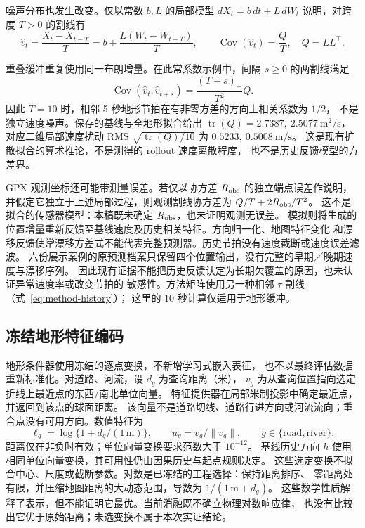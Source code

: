 \documentclass[UTF8,11pt]{ctexart}
\begin{document}
\begin{samepage}
噪声分布也发生改变。仅以常数 \(b,L\) 的局部模型
\(dX_t=b\,dt+L\,dW_t\) 说明，对跨度 \(T>0\) 的割线有
\begin{equation}
\widehat v_t=\frac{X_t-X_{t-T}}{T}
=b+\frac{L(W_t-W_{t-T})}{T},\qquad
\operatorname{Cov}(\widehat v_t)=\frac{Q}{T},\quad Q=LL^\top .
\label{eq:secant-local-noise}
\end{equation}
\end{samepage}
重叠缓冲重复使用同一布朗增量。在此常系数示例中，间隔 \(s\ge0\) 的两割线满足
\begin{equation}
\operatorname{Cov}(\widehat v_t,\widehat v_{t+s})
=\frac{(T-s)_+}{T^2}Q .
\label{eq:secant-overlap}
\end{equation}
因此 \(T=10\) 时，相邻 5 秒地形节拍在有非零方差的方向上相关系数为 \(1/2\)，
不是独立速度噪声。保存的基线与全地形拟合给出
\(\operatorname{tr}(Q)=2.7387,\ 2.5077\ \mathrm{m^2/s}\)，
对应二维局部速度扰动 RMS \(\sqrt{\operatorname{tr}(Q)/10}\)
为 \(0.5233,\ 0.5008\ \mathrm{m/s}\)。
这是现有扩散拟合的算术推论，不是测得的 rollout 速度离散程度，
也不是历史反馈模型的方差界。

GPX 观测坐标还可能带测量误差。若仅以协方差 \(R_{\rm obs}\) 的独立端点误差作说明，
并假定它独立于上述局部过程，则观测割线协方差为 \(Q/T+2R_{\rm obs}/T^2\)。
这不是拟合的传感器模型：本稿既未确定 \(R_{\rm obs}\)，也未证明观测无误差。
模拟则将生成的位置增量重新反馈至基线速度及历史相关特征。方向归一化、地图特征变化
和漂移反馈使常漂移方差式不能代表完整预测器。历史节拍没有速度截断或速度误差滤波。
六份展示案例的原预测档案只保留四个位置输出，没有完整的早期／晚期速度与漂移序列。
因此现有证据不能把历史反馈认定为长期欠覆盖的原因，也未认证异常速度率或改变节拍的
敏感性。方法矩阵使用另一种相邻 \(\tau\) 割线（式~\eqref{eq:method-history}）；
这里的 10 秒计算仅适用于地形缓冲。

\subsection{冻结地形特征编码}
\label{sec:feature-encoding}
地形条件器使用冻结的逐点变换，不新增学习式嵌入表征，
也不以最终评估数据重新标准化。对道路、河流，设 \(d_g\) 为查询距离（米），
\(v_g\) 为从查询位置指向选定折线上最近点的东西/南北单位向量。
特征提供器在局部米制投影中确定最近点，并返回到该点的球面距离。
该向量不是道路切线、道路行进方向或河流流向；重合点没有可用方向。数值特征为
\begin{equation}
\ell_g=\log\{1+d_g/(1\,\mathrm{m})\},\qquad
u_g=v_g/\|v_g\|,\qquad g\in\{\mathrm{road},\mathrm{river}\}.
\label{eq:distance-encoding}
\end{equation}
距离仅在非负时有效；单位向量变换要求范数大于 \(10^{-12}\)。
基线历史方向 \(h\) 使用相同单位向量变换，其可用性仍由因果历史与起点规则决定。
这些选定变换不拟合中心、尺度或截断参数。对数是已冻结的工程选择：保持距离排序、
零距离处有限，并压缩地图距离的大动态范围，导数为 \(1/(1\,\mathrm m+d_g)\)。
这些数学性质解释了表示，但不能证明它最优。当前消融既不确立物理对数响应律，
也没有比较出它优于原始距离；未选变换不属于本次实证结论。
\end{document}
